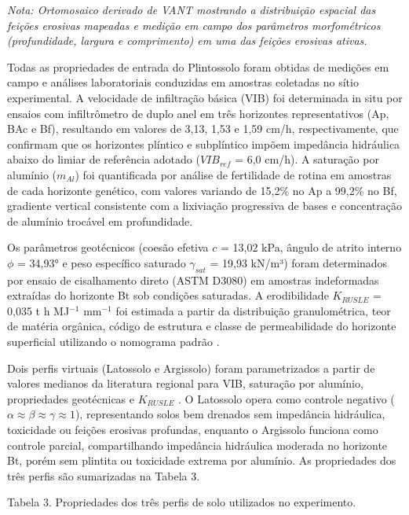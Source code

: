 \documentclass[
  brazilian,
  authoryear,
  preprint]{elsarticle}
\begin{document}
\emph{Nota: Ortomosaico derivado de VANT mostrando a distribuição
espacial das feições erosivas mapeadas e medição em campo dos parâmetros
morfométricos (profundidade, largura e comprimento) em uma das feições
erosivas ativas.}

Todas as propriedades de entrada do Plintossolo foram obtidas de
medições em campo e análises laboratoriais conduzidas em amostras
coletadas no sítio experimental. A velocidade de infiltração básica
(VIB) foi determinada in situ por ensaios com infiltrômetro de duplo
anel em três horizontes representativos (Ap, BAc e Bf), resultando em
valores de 3,13, 1,53 e 1,59 cm/h, respectivamente, que confirmam que os
horizontes plíntico e subplíntico impõem impedância hidráulica abaixo do
limiar de referência adotado (\(VIB_{ref}\) = 6,0 cm/h). A saturação por
alumínio (\(m_{Al}\)) foi quantificada por análise de fertilidade de
rotina em amostras de cada horizonte genético, com valores variando de
15,2\% no Ap a 99,2\% no Bf, gradiente vertical consistente com a
lixiviação progressiva de bases e concentração de alumínio trocável em
profundidade.

Os parâmetros geotécnicos (coesão efetiva \(c\) = 13,02 kPa, ângulo de
atrito interno \(\phi\) = 34,93° e peso específico saturado
\(\gamma_{sat}\) = 19,93 kN/m³) foram determinados por ensaio de
cisalhamento direto (ASTM D3080) em amostras indeformadas extraídas do
horizonte Bt sob condições saturadas. A erodibilidade \(K_{RUSLE}\) =
0,035 t h MJ\(^{-1}\) mm\(^{-1}\) foi estimada a partir da distribuição
granulométrica, teor de matéria orgânica, código de estrutura e classe
de permeabilidade do horizonte superficial utilizando o nomograma padrão
\citep{wischmeier_et_al_1971}.

Dois perfis virtuais (Latossolo e Argissolo) foram parametrizados a
partir de valores medianos da literatura regional para VIB, saturação
por alumínio, propriedades geotécnicas e \(K_{RUSLE}\)
\citep{silva_et_al_2009, bertoni_lombardi_neto_2017}. O Latossolo opera
como controle negativo
(\(\alpha \approx \beta \approx \gamma \approx 1\)), representando solos
bem drenados sem impedância hidráulica, toxicidade ou feições erosivas
profundas, enquanto o Argissolo funciona como controle parcial,
compartilhando impedância hidráulica moderada no horizonte Bt, porém sem
plintita ou toxicidade extrema por alumínio. As propriedades dos três
perfis são sumarizadas na Tabela 3.

Tabela 3. Propriedades dos três perfis de solo utilizados no
experimento.
\end{document}
